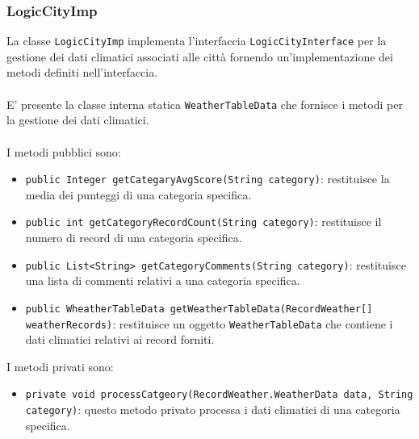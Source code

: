 \subsubsection{LogicCityImp}
La classe \texttt{LogicCityImp} implementa l'interfaccia \texttt{LogicCityInterface} per la gestione dei dati climatici associati alle città
fornendo un'implementazione dei metodi definiti nell'interfaccia.\\
\\
E' presente la classe interna statica \texttt{WeatherTableData} che fornisce i metodi per la gestione dei dati climatici.\\
\\
I metodi pubblici sono:
\begin{itemize}
      \item \texttt{public Integer getCategaryAvgScore(String category)}: restituisce la media dei punteggi di una categoria specifica.
      \item \texttt{public int getCategoryRecordCount(String category)}: restituisce il numero di record di una categoria specifica.
      \item \texttt{public List<String> getCategoryComments(String category)}: restituisce una lista di commenti relativi a una categoria specifica.
      \item \texttt{public WheatherTableData getWeatherTableData(RecordWeather[] weatherRecords)}: restituisce un oggetto \texttt{WeatherTableData} che contiene i dati climatici relativi ai record forniti.
\end{itemize}
I metodi privati sono:
\begin{itemize}
      \item \texttt{private void processCatgeory(RecordWeather.WeatherData data, String category)}: questo metodo privato processa i dati climatici di una categoria specifica.
\end{itemize}

